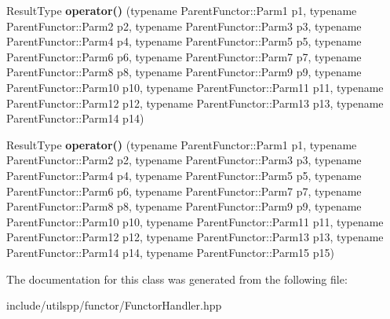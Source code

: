 \begin{DoxyCompactItemize}
\item 
\hypertarget{classutilspp_1_1FunctorHandler_a0272e78f3272dd4cd2871a1c082006a8}{Result\-Type {\bfseries operator()} (typename Parent\-Functor\-::\-Parm1 p1, typename Parent\-Functor\-::\-Parm2 p2, typename Parent\-Functor\-::\-Parm3 p3, typename Parent\-Functor\-::\-Parm4 p4, typename Parent\-Functor\-::\-Parm5 p5, typename Parent\-Functor\-::\-Parm6 p6, typename Parent\-Functor\-::\-Parm7 p7, typename Parent\-Functor\-::\-Parm8 p8, typename Parent\-Functor\-::\-Parm9 p9, typename Parent\-Functor\-::\-Parm10 p10, typename Parent\-Functor\-::\-Parm11 p11, typename Parent\-Functor\-::\-Parm12 p12, typename Parent\-Functor\-::\-Parm13 p13, typename Parent\-Functor\-::\-Parm14 p14)}\label{classutilspp_1_1FunctorHandler_a0272e78f3272dd4cd2871a1c082006a8}

\item 
\hypertarget{classutilspp_1_1FunctorHandler_a5fe82645dbb655281aab8474553dd87a}{Result\-Type {\bfseries operator()} (typename Parent\-Functor\-::\-Parm1 p1, typename Parent\-Functor\-::\-Parm2 p2, typename Parent\-Functor\-::\-Parm3 p3, typename Parent\-Functor\-::\-Parm4 p4, typename Parent\-Functor\-::\-Parm5 p5, typename Parent\-Functor\-::\-Parm6 p6, typename Parent\-Functor\-::\-Parm7 p7, typename Parent\-Functor\-::\-Parm8 p8, typename Parent\-Functor\-::\-Parm9 p9, typename Parent\-Functor\-::\-Parm10 p10, typename Parent\-Functor\-::\-Parm11 p11, typename Parent\-Functor\-::\-Parm12 p12, typename Parent\-Functor\-::\-Parm13 p13, typename Parent\-Functor\-::\-Parm14 p14, typename Parent\-Functor\-::\-Parm15 p15)}\label{classutilspp_1_1FunctorHandler_a5fe82645dbb655281aab8474553dd87a}

\end{DoxyCompactItemize}


The documentation for this class was generated from the following file\-:\begin{DoxyCompactItemize}
\item 
include/utilspp/functor/Functor\-Handler.\-hpp\end{DoxyCompactItemize}
